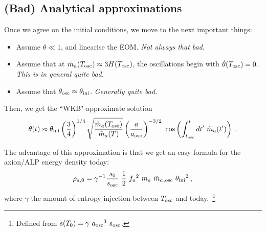 \documentclass[10pt,utf8,compress,xcolor=dvipsnames]{beamer}
\begin{document}
\subsection{(Bad) Analytical approximations}
\begin{frame}{\insertsubsectionhead}
	Once we agree on the initial conditions, we move to the next important things:\pause
	\begin{itemize}
		\item Assume $\theta \ll 1$, and linearise the EOM. {\sl Not always that bad.}\pause
		\item Assume that at $\tilde m_{a}{}(T_{\rm osc}{}) \approx 3H(T_{\rm osc}{})$, the oscillations begin with $\dot\theta(T_{\rm osc}{})=0$. {\sl This is in general quite bad.}\pause
		\item Assume that $\theta_{\rm osc}{} \approx \theta_{\rm ini}{}$. {\sl Generally quite bad.}\pause
	\end{itemize}
	
	Then, we get the ``WKB"-approximate solution
	\begin{equation*}\vspace*{-0.2cm}
	\theta(t) \approx \thetai \lrb{\dfrac{3}{4}}^{1/4} \sqrt{ \dfrac{ \maT(\Tosc) }{\maT(T)} } \lrb{\dfrac{a}{\aosc}}^{-3/2} \  \cos\lrb{ \int_{\tosc}^t d t^\prime  \ \maT(t^\prime)}   \;.
	\end{equation*}
	
	The advantage of this approximation is that we get an easy formula for the axion/ALP energy density today:
	\begin{equation*}\vspace*{-0.2cm}		
		\rho_{a,0} = \gamma^{-1}  \dfrac{s_0}{s_{\rm osc}} \  \dfrac{1 }{2}  \ \fa^2 \ \ma \ \maT_{,{\rm osc}} \ \thetai^2    \;,
	\end{equation*}
	where $\gamma$ the amount of entropy injection between $T_{\rm osc}{}$ and today.~\footnote{\fontF Defined from $s(T_0) = \gamma \ a_{\rm osc}{}^3 \ s_{\rm osc}$.}
\end{frame}

\end{document}
